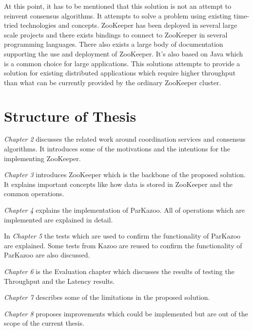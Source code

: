 At this point, it has to be mentioned that this solution is not an attempt to reinvent consensus algorithms. It attempts to solve a problem using existing time-tried technologies and concepts. ZooKeeper has been deployed in several large scale projects and there exists bindings to connect to ZooKeeper in several programming languages. There also exists a large body of documentation supporting the use and deployment of ZooKeeper. It's also based on Java which is a common choice for large applications. This solutions attempts to provide a solution for existing distributed applications which require higher throughput than what can be currently provided by the ordinary ZooKeeper cluster.

\section{Structure of Thesis}

\textit{Chapter 2} discusses the related work around coordination services and consensus algorithms. It introduces some of the motivations and the intentions for the implementing ZooKeeper.

\textit{Chapter 3} introduces ZooKeeper which is the backbone of the proposed solution. It explains important concepts like how data is stored in ZooKeeper and the common operations.

\textit{Chapter 4} explains the implementation of ParKazoo. All of operations which are implemented are explained in detail.

In \textit{Chapter 5} the tests which are used to confirm the functionality of ParKazoo are explained. Some tests from Kazoo are reused to confirm the functionality of ParKazoo are also discussed.

\textit{Chapter 6} is the Evaluation chapter which discusses the results of testing the Throughput and the Latency results.

\textit{Chapter 7} describes some of the limitations in the proposed solution.

\textit{Chapter 8} proposes improvements which could be implemented but are out of the scope of the current thesis.
